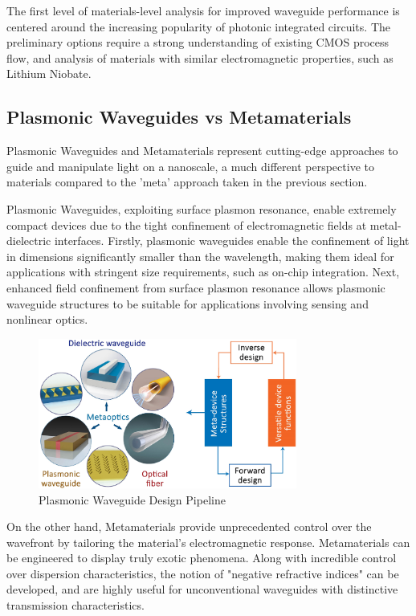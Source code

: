 \documentclass[10pt]{article}
\begin{document}
The first level of materials-level analysis for improved waveguide performance is centered around the increasing popularity of photonic integrated circuits. 
The preliminary options require a strong understanding of existing CMOS process flow, and analysis of materials with similar electromagnetic properties, such as Lithium Niobate.

\subsection{Plasmonic Waveguides vs Metamaterials}

Plasmonic Waveguides and Metamaterials represent cutting-edge approaches to guide and manipulate light on a nanoscale, a much different perspective to materials compared to the 'meta' approach taken in the previous section.

Plasmonic Waveguides, exploiting surface plasmon resonance, enable extremely compact devices due to the tight confinement of electromagnetic fields at metal-dielectric interfaces. 
Firstly, plasmonic waveguides enable the confinement of light in dimensions significantly smaller than the wavelength, making them ideal for applications with stringent size requirements, such as on-chip integration.
Next, enhanced field confinement from surface plasmon resonance allows plasmonic waveguide structures to be suitable for applications involving sensing and nonlinear optics.

\begin{figure}[h]
    \centering
    \includegraphics[width=8.5cm]{plasmonic.png}
    \caption{Plasmonic Waveguide Design Pipeline} 
    \end{figure}


On the other hand, Metamaterials provide unprecedented control over the wavefront by tailoring the material's electromagnetic response. 
Metamaterials can be engineered to display truly exotic phenomena. Along with incredible control over dispersion characteristics, the notion of "negative refractive indices" can be developed, and are highly 
useful for unconventional waveguides with distinctive transmission characteristics.
\end{document}
